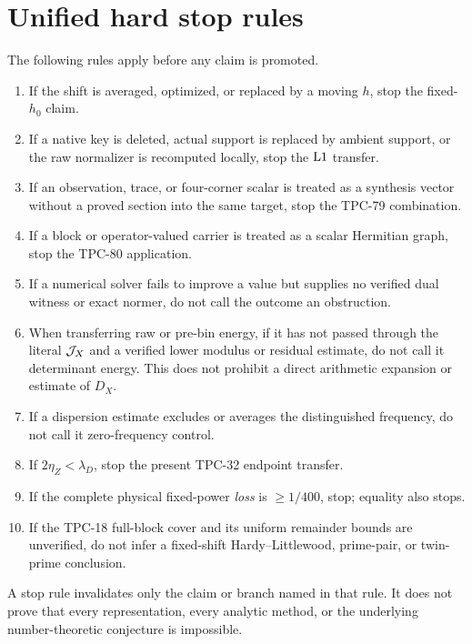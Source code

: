 \section{Unified hard stop rules}
\label{sec:stop-rules}

The following rules apply before any claim is promoted.

\begin{enumerate}[label=\textbf{S\arabic*.},leftmargin=3.3em]
\item If the shift is averaged, optimized, or replaced by a moving
\(h\), stop the fixed-\(h_0\) claim.
\item If a native key is deleted, actual support is replaced by
ambient support, or the raw normalizer is recomputed locally, stop the
\(\mathrm{L1}\) transfer.
\item If an observation, trace, or four-corner scalar is treated as a
synthesis vector without a proved section into the same target, stop
the TPC-79 combination.
\item If a block or operator-valued carrier is treated as a scalar
Hermitian graph, stop the TPC-80 application.
\item If a numerical solver fails to improve a value but supplies no
verified dual witness or exact normer, do not call the outcome an
obstruction.
\item When transferring raw or pre-bin energy, if it has not passed
through the literal \(\mathcal J_X\) and a verified lower modulus or residual
estimate, do not call it determinant energy.  This does not prohibit
a direct arithmetic expansion or estimate of \(D_X\).
\item If a dispersion estimate excludes or averages the distinguished
frequency, do not call it zero-frequency control.
\item If \(2\eta_Z<\lambda_D\), stop the present TPC-32 endpoint
transfer.
\item If the complete physical fixed-power \emph{loss} is
\(\ge1/400\), stop; equality also stops.
\item If the TPC-18 full-block cover and its uniform remainder bounds
are unverified, do not infer a fixed-shift Hardy--Littlewood,
prime-pair, or twin-prime conclusion.
\end{enumerate}

\begin{proposition}
\label{prop:scope-stop}
A stop rule invalidates only the claim or branch named in that rule.
It does not prove that every representation, every analytic method,
or the underlying number-theoretic conjecture is impossible.
\end{proposition}

